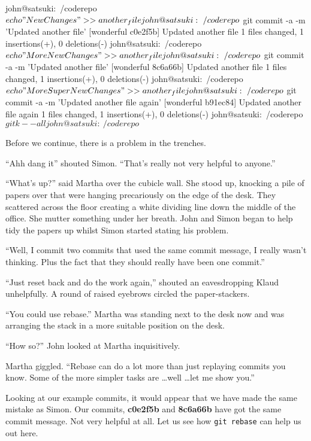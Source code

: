 \begin{code}
john@satsuki:~/coderepo$ echo "New Changes" >> another_file
john@satsuki:~/coderepo$ git commit -a -m 'Updated another file'
[wonderful c0e2f5b] Updated another file
 1 files changed, 1 insertions(+), 0 deletions(-)
john@satsuki:~/coderepo$ echo "More New Changes" >> another_file
john@satsuki:~/coderepo$ git commit -a -m 'Updated another file'
[wonderful 8c6a66b] Updated another file
 1 files changed, 1 insertions(+), 0 deletions(-)
john@satsuki:~/coderepo$ echo "More Super New Changes" >> another_file
john@satsuki:~/coderepo$ git commit -a -m 'Updated another file again'
[wonderful b91ec84] Updated another file again
 1 files changed, 1 insertions(+), 0 deletions(-)
john@satsuki:~/coderepo$ gitk --all
john@satsuki:~/coderepo$
\end{code}

Before we continue, there is a problem in the trenches.

\begin{trenches}
``Ahh dang it'' shouted Simon.
``That's really not very helpful to anyone.''

``What's up?'' said Martha over the cubicle wall.
She stood up, knocking a pile of papers over that were hanging precariously on the edge of the desk.
They scattered across the floor creating a white dividing line down the middle of the office.
She mutter something under her breath.
John and Simon began to help tidy the papers up whilst Simon started stating his problem.

``Well, I commit two commits that used the same commit message, I really wasn't thinking. Plus the fact that they should really have been one commit.''

``Just reset back and do the work again,'' shouted an eavesdropping Klaud unhelpfully.
A round of raised eyebrows circled the paper-stackers.

``You could use rebase.'' Martha was standing next to the desk now and was arranging the stack in a more suitable position on the desk.

``How so?'' John looked at Martha inquisitively.

Martha giggled.
``Rebase can do a lot more than just replaying commits you know. Some of the more simpler tasks are \ldots well \ldots let me show you.''
\end{trenches}

Looking at our example commits, it would appear that we have made the same mistake as Simon.
Our commits, \textbf{c0e2f5b} and \textbf{8c6a66b} have got the same commit message.
Not very helpful at all.
Let us see how \texttt{git rebase} can help us out here.

